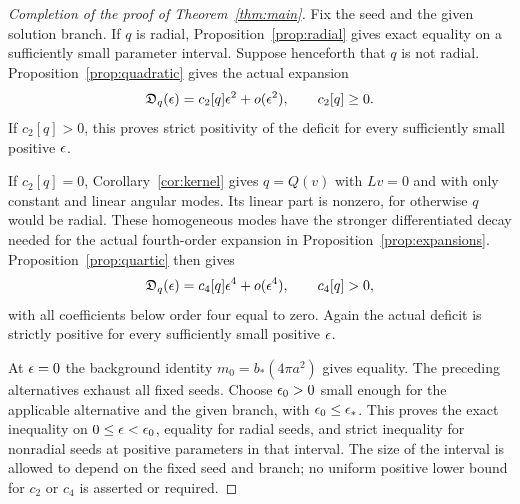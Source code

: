 \begin{proof}[Completion of the proof of Theorem~\ref{thm:main}]
Fix the seed and the given solution branch.  If $q$ is radial,
Proposition~\ref{prop:radial} gives exact equality on a sufficiently
small parameter interval.
Suppose henceforth that $q$ is not radial.
Proposition~\ref{prop:quadratic} gives the actual expansion
\[
 \mathfrak D_q(\epsilon)=c_2[q]\epsilon^2+o(\epsilon^2),
 \qquad c_2[q]\geq0.
\]
If $c_2[q]>0$, this proves strict positivity of the deficit for every
sufficiently small positive $\epsilon$.

If $c_2[q]=0$, Corollary~\ref{cor:kernel} gives
$q=Q(v)$ with $Lv=0$ and with only constant and linear angular modes.
Its linear part is nonzero, for otherwise $q$ would be radial.
These homogeneous modes have the stronger differentiated decay needed
for the actual fourth-order expansion in
Proposition~\ref{prop:expansions}.
Proposition~\ref{prop:quartic} then gives
\[
 \mathfrak D_q(\epsilon)=c_4[q]\epsilon^4+o(\epsilon^4),
 \qquad c_4[q]>0,
\]
with all coefficients below order four equal to zero.
Again the actual deficit is strictly positive for every sufficiently
small positive $\epsilon$.

At $\epsilon=0$ the background identity
$m_0=b_*(4\pi a^2)$ gives equality.
The preceding alternatives exhaust all fixed seeds.  Choose
$\epsilon_0>0$ small enough for the applicable alternative and the given
branch, with $\epsilon_0\leq\epsilon_*$.
This proves the exact inequality on $0\leq\epsilon<\epsilon_0$, equality for
radial seeds, and strict inequality for nonradial seeds at positive
parameters in that interval.
The size of the interval is allowed to depend on the fixed seed and
branch; no uniform positive lower bound for $c_2$ or $c_4$ is asserted
or required.
\end{proof}
